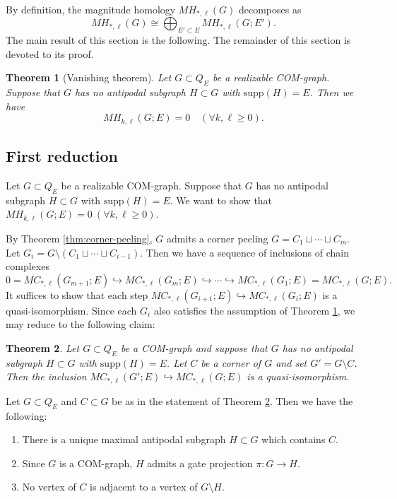 \documentclass{amsart}
\numberwithin{equation}{section}
\newtheorem{thm}{Theorem}[section]
\theoremstyle{plain}
\theoremstyle{remark}
\theoremstyle{definition}
\numberwithin{equation}{section}
\newcommand{\supp}{\mathrm{supp}}
\begin{document}
By definition, the magnitude homology $MH_{*,\ell}(G)$ decomposes as
\[
MH_{*,\ell}(G)\cong \bigoplus_{E'\subset E}MH_{*,\ell}(G;E').
\]
The main result of this section is the following. The remainder of this section is devoted to its proof.

\begin{thm}[Vanishing theorem]\label{thm:COM_vanish}
    Let $G\subset Q_E$ be a realizable COM-graph.
    Suppose that $G$ has no antipodal subgraph $H\subset G$ with $\supp(H)=E$.
    Then we have
    \[
    MH_{k,\ell}(G;E)=0\quad (\forall k,\ell\geq 0).
    \]
\end{thm}

\subsection{First reduction}
Let $G\subset Q_E$ be a realizable COM-graph.
Suppose that $G$ has no antipodal subgraph $H\subset G$ with $\supp(H)=E$.
We want to show that $MH_{k,\ell}(G;E)=0\ (\forall k,\ell\geq 0)$.

By Theorem \ref{thm:corner-peeling}, $G$ admits a corner peeling $G=C_1\sqcup\cdots\sqcup C_m$.
Let $G_i=G\setminus (C_1\sqcup\cdots\sqcup C_{i-1})$.
Then we have a sequence of inclusions of chain complexes
\[
0=MC_{*,\ell}(G_{m+1};E)\hookrightarrow
MC_{*,\ell}(G_m;E)\hookrightarrow
\cdots\hookrightarrow
MC_{*,\ell}(G_1;E)=MC_{*,\ell}(G;E).
\]
It suffices to show that each step $MC_{*,\ell}(G_{i+1};E)\hookrightarrow MC_{*,\ell}(G_i;E)$ is a quasi-isomorphism.
Since each $G_i$ also satisfies the assumption of Theorem \ref{thm:COM_vanish}, we may reduce to the following claim:

\begin{thm}\label{thm:corner-excision}
    Let $G\subset Q_E$ be a COM-graph and suppose that $G$ has no antipodal subgraph $H\subset G$ with $\supp(H)=E$.
    Let $C$ be a corner of $G$ and set $G'=G\setminus C$.
    Then the inclusion $MC_{*,\ell}(G';E)\hookrightarrow MC_{*,\ell}(G;E)$ is a quasi-isomorphism.
\end{thm}

Let $G\subset Q_E$ and $C\subset G$ be as in the statement of Theorem \ref{thm:corner-excision}.
Then we have the following:
\begin{enumerate}
        \item There is a unique maximal antipodal subgraph $H\subset G$ which contains $C$.
        \item Since $G$ is a COM-graph, $H$ admits a gate projection $\pi\colon G\to H$.
        \item No vertex of $C$ is adjacent to a vertex of $G\setminus H$.
\end{enumerate}
\end{document}
